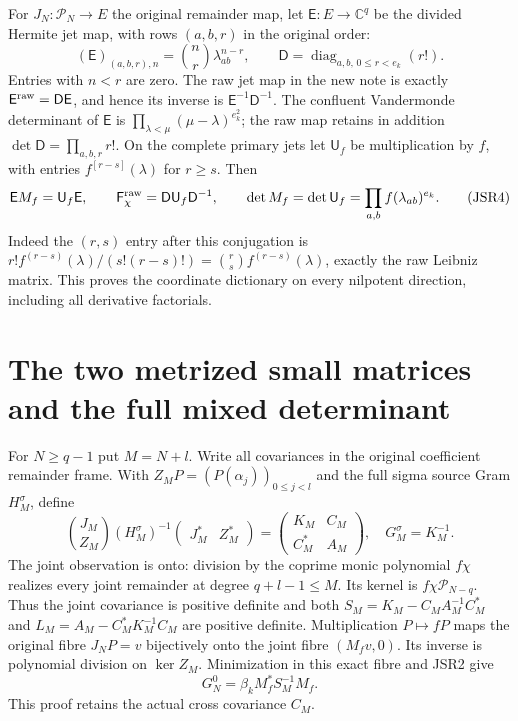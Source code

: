 \documentclass[11pt,a4paper]{article}
\newcommand{\C}{\mathbb C}
\newcommand{\diag}{\operatorname{diag}}
\begin{document}
For $J_N:\mathcal P_N\to E$ the original remainder map, let
$\mathsf E:E\to\C^q$ be the divided Hermite jet map, with
rows $(a,b,r)$ in the original order:
\[
 (\mathsf E)_{(a,b,r),n}=\binom nr\lambda_{ab}^{n-r},\qquad
 \mathsf D=\diag_{a,b,\,0\leq r<e_k}(r!).
 \tag{JSR3}
\]
Entries with $n<r$ are zero. The raw jet map in the new note is
exactly $\mathsf E^{\rm raw}=\mathsf D\mathsf E$, and hence
its inverse is $\mathsf E^{-1}\mathsf D^{-1}$.
The confluent Vandermonde determinant of $\mathsf E$ is
$\prod_{\lambda<\mu}(\mu-\lambda)^{e_k^2}$; the raw map
retains in addition $\det\mathsf D=\prod_{a,b,r}r!$.
On the complete primary jets let $\mathsf U_f$ be multiplication
by $f$, with entries $f^{[r-s]}(\lambda)$ for $r\geq s$.
Then
\[
 \mathsf E M_f=\mathsf U_f\mathsf E,\qquad
 \mathsf F_\chi^{\rm raw}=\mathsf D\mathsf U_f\mathsf D^{-1},
 \qquad
 \det M_f=\det\mathsf U_f=\prod_{a,b}f(\lambda_{ab})^{e_k}.
 \tag{JSR4}
\]
Indeed the $(r,s)$ entry after this conjugation is
$r!f^{(r-s)}(\lambda)/(s!(r-s)!)
=\binom rs f^{(r-s)}(\lambda)$, exactly the raw Leibniz matrix.
This proves the coordinate dictionary on every nilpotent
direction, including all derivative factorials.

\section{The two metrized small matrices and the full mixed determinant}

For $N\geq q-1$ put $M=N+l$. Write all covariances in the
original coefficient remainder frame. With
$Z_MP=(P(\alpha_j))_{0\leq j<l}$ and the full sigma source
Gram $H_M^\sigma$, define
\[
 \binom{J_M}{Z_M}(H_M^\sigma)^{-1}
       \begin{pmatrix}J_M^*&Z_M^*\end{pmatrix}
 =\begin{pmatrix}K_M&C_M\\C_M^*&A_M\end{pmatrix},\quad
 G_M^\sigma=K_M^{-1}.
 \tag{JSR5}
\]
The joint observation is onto: division by the coprime monic
polynomial $f\chi$ realizes every joint remainder at degree
$q+l-1\leq M$. Its kernel is $f\chi\mathcal P_{N-q}$.
Thus the joint covariance is positive definite and both
$S_M=K_M-C_MA_M^{-1}C_M^*$ and
$L_M=A_M-C_M^*K_M^{-1}C_M$ are positive definite.
Multiplication $P\mapsto fP$ maps the original fibre
$J_NP=v$ bijectively onto the joint fibre $(M_fv,0)$.
Its inverse is polynomial division on $\ker Z_M$.
Minimization in this exact fibre and JSR2 give
\[
 G_N^0=\beta_k M_f^*S_M^{-1}M_f.
 \tag{JSR6}
\]
This proof retains the actual cross covariance $C_M$.
\end{document}
